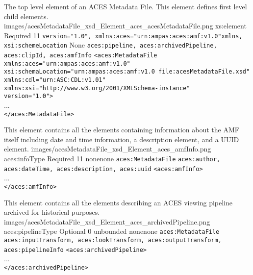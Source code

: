         {The top level element of an ACES Metadata File.  This element defines first level child elements.}
        {images/acesMetadataFile_xsd_Element_aces_acesMetadataFile.png}
        {xs:element}
        {Required}
        {1}{1}
        {\texttt{version="1.0", xmlns:aces="urn:ampas:aces:amf:v1.0"}}{\texttt{xmlns, xsi:schemeLocation}}
        {None}
        {\texttt{aces:pipeline, aces:archivedPipeline, aces:clipId, aces:amfInfo}}
        { \lstinline{<aces:MetadataFile} \\
        \lstinline{xmlns:aces="urn:ampas:aces:amf:v1.0"} \\
        \lstinline{xsi:schemaLocation="urn:ampas:aces:amf:v1.0 file:acesMetadataFile.xsd"} \\ \lstinline{xmlns:cdl="urn:ASC:CDL:v1.01"}\\
        \lstinline{xmlns:xsi="http://www.w3.org/2001/XMLSchema-instance"}\\
        \lstinline{version="1.0">}\\
        ... \\
        \lstinline{</aces:MetadataFile>}}

        {This element contains all the elements containing information about the AMF itself including date and time information, a description element, and a UUID element.}
        {images/acesMetadataFile_xsd_Element_aces_amfInfo.png}
        {aces:infoType}
        {Required}
        {1}{1}
        {none}{none}
        {\texttt{aces:MetadataFile}}
        {\texttt{aces:author, aces:dateTime, aces:description, aces:uuid}}
        {\lstinline{<aces:amfInfo>} \\
        ... \\
        \lstinline{</aces:amfInfo>}}

        {This element contains all the elements describing an ACES viewing pipeline archived for historical purposes.}
        {images/acesMetadataFile_xsd_Element_aces_archivedPipeline.png}
        {aces:pipelineType}
        {Optional}
        {0}
        {unbounded}
        {none}{none}
        {\texttt{aces:MetadataFile}}
        {\texttt{aces:inputTransform, aces:lookTransform, aces:outputTransform, \\ aces:pipelineInfo}}
        {\lstinline{<aces:archivedPipeline>} \\
        ... \\
        \lstinline{</aces:archivedPipeline>}}

